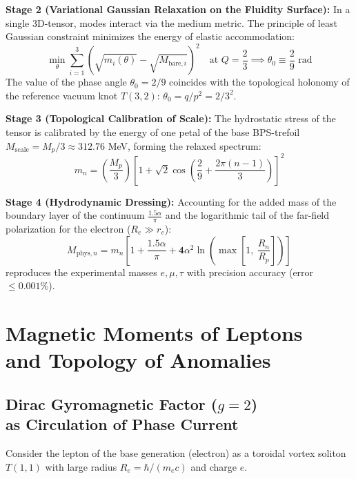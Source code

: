 \documentclass[12pt,a4paper]{article}
\begin{document}
	\textbf{Stage 2 (Variational Gaussian Relaxation on the Fluidity Surface):}
	In a single 3D-tensor, modes interact via the medium metric. The principle of least Gaussian constraint minimizes the energy of elastic accommodation:
	\begin{equation}
		\min_{\theta} \sum_{i=1}^3 \left( \sqrt{m_i(\theta)} - \sqrt{M_{\mathrm{bare}, i}} \right)^2 \quad \text{at } Q = \frac{2}{3} \implies \theta_0 \equiv \frac{2}{9} \text{ rad}
	\end{equation}
	The value of the phase angle $\theta_0 = 2/9$ coincides with the topological holonomy of the reference vacuum knot $T(3,2)$: $\theta_0 = q/p^2 = 2/3^2$.
	
	\textbf{Stage 3 (Topological Calibration of Scale):}
	The hydrostatic stress of the tensor is calibrated by the energy of one petal of the base BPS-trefoil $M_{\text{scale}} = M_p / 3 \approx 312.76$ MeV, forming the relaxed spectrum:
	\begin{equation}
		m_n = \left(\frac{M_p}{3}\right) \left[ 1 + \sqrt{2} \cos\left( \frac{2}{9} + \frac{2\pi(n-1)}{3} \right) \right]^2
	\end{equation}
	
	\textbf{Stage 4 (Hydrodynamic Dressing):}
	Accounting for the added mass of the boundary layer of the continuum $\frac{1.5\alpha}{\pi}$ and the logarithmic tail of the far-field polarization for the electron ($R_e \gg r_e$):
	\begin{equation}
		M_{\mathrm{phys}, n} = m_n \left[ 1 + \frac{1.5\alpha}{\pi} + \mathbf{4} \alpha^2 \ln\left( \max\left[ 1, \ \frac{R_n}{R_p} \right] \right) \right]
	\end{equation}
	reproduces the experimental masses $e, \mu, \tau$ with precision accuracy (error $\le 0.001\%$).
	
	\section{Magnetic Moments of Leptons\\ and Topology of Anomalies}
	
	\subsection{Dirac Gyromagnetic Factor ($g=2$)\\ as Circulation of Phase Current}
	Consider the lepton of the base generation (electron) as a toroidal vortex soliton $T(1,1)$ with large radius $R_e = \hbar / (m_e c)$ and charge $e$.
	
\end{document}
